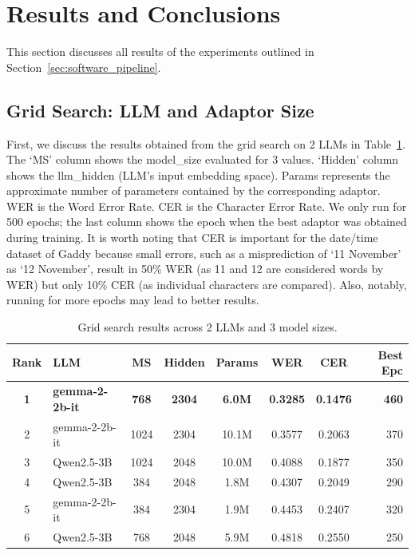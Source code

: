 \section{Results and Conclusions}

This section discusses all results of the experiments outlined in Section~\ref{sec:software_pipeline}.

\subsection{Grid Search: LLM and Adaptor Size}

First, we discuss the results obtained from the grid search on 2 LLMs in Table~\ref{tab:grid_search}. The `MS' column shows the model\_size evaluated for 3 values. `Hidden' column shows the llm\_hidden (LLM's input embedding space). Params represents the approximate number of parameters contained by the corresponding adaptor. WER is the Word Error Rate. CER is the Character Error Rate. We only run for 500 epochs; the last column shows the epoch when the best adaptor was obtained during training. It is worth noting that CER is important for the date/time dataset of Gaddy because small errors, such as a misprediction of `11 November' as `12 November', result in 50\% WER (as 11 and 12 are considered words by WER) but only 10\% CER (as individual characters are compared). Also, notably, running for more epochs may lead to better results.

\begin{table}[ht]
\centering
\caption{Grid search results across 2 LLMs and 3 model sizes.}
\label{tab:grid_search}
\small
\begin{tabular}{clcccccr}
\toprule
\textbf{Rank} & \textbf{LLM} & \textbf{MS} & \textbf{Hidden} & \textbf{Params} & \textbf{WER} & \textbf{CER} & \textbf{Best Epc} \\
\midrule
\rowcolor{gray!12} \textbf{1} & \textbf{gemma-2-2b-it} & \textbf{768} & \textbf{2304} & \textbf{6.0M} & \textbf{0.3285} & \textbf{0.1476} & \textbf{460} \\
2 & gemma-2-2b-it & 1024 & 2304 & 10.1M & 0.3577 & 0.2063 & 370 \\
3 & Qwen2.5-3B & 1024 & 2048 & 10.0M & 0.4088 & 0.1877 & 350 \\
4 & Qwen2.5-3B & 384 & 2048 & 1.8M & 0.4307 & 0.2049 & 290 \\
5 & gemma-2-2b-it & 384 & 2304 & 1.9M & 0.4453 & 0.2407 & 320 \\
6 & Qwen2.5-3B & 768 & 2048 & 5.9M & 0.4818 & 0.2550 & 250 \\
\bottomrule
\end{tabular}
\end{table}

